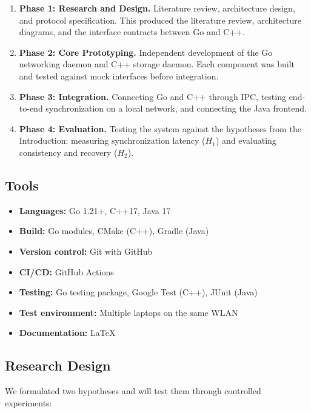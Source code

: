 \begin{enumerate}
    \item \textbf{Phase 1: Research and Design.} Literature review, architecture design, and protocol specification. This produced the literature review, architecture diagrams, and the interface contracts between Go and C++.

    \item \textbf{Phase 2: Core Prototyping.} Independent development of the Go networking daemon and C++ storage daemon. Each component was built and tested against mock interfaces before integration.

    \item \textbf{Phase 3: Integration.} Connecting Go and C++ through IPC, testing end-to-end synchronization on a local network, and connecting the Java frontend.

    \item \textbf{Phase 4: Evaluation.} Testing the system against the hypotheses from the Introduction: measuring synchronization latency ($H_1$) and evaluating consistency and recovery ($H_2$).
\end{enumerate}

\subsection{Tools}

\begin{itemize}
    \item \textbf{Languages:} Go 1.21+, C++17, Java 17
    \item \textbf{Build:} Go modules, CMake (C++), Gradle (Java)
    \item \textbf{Version control:} Git with GitHub
    \item \textbf{CI/CD:} GitHub Actions
    \item \textbf{Testing:} Go testing package, Google Test (C++), JUnit (Java)
    \item \textbf{Test environment:} Multiple laptops on the same WLAN
    \item \textbf{Documentation:} \LaTeX
\end{itemize}

\subsection{Research Design}

We formulated two hypotheses and will test them through controlled experiments:

